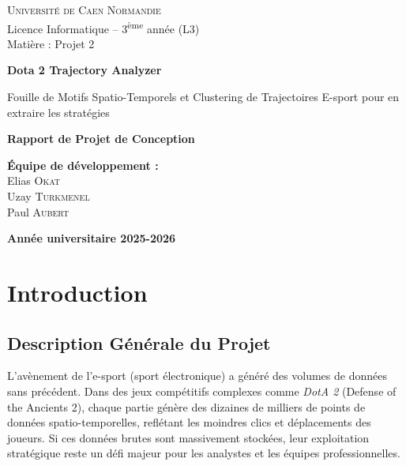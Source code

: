 \documentclass[11pt, a4paper]{article}
\begin{document}
\begin{titlepage}
    \centering
    \vspace*{1cm}
    
    \Large \textsc{Université de Caen Normandie} \\
    \large Licence Informatique -- 3\textsuperscript{ème} année (L3) \\
    \large Matière : Projet 2
    
    \vspace{3cm}
    
    \Huge
    \textbf{Dota 2 Trajectory Analyzer}
    
    \vspace{0.5cm}
    \LARGE
    Fouille de Motifs Spatio-Temporels et Clustering de Trajectoires E-sport pour en extraire les stratégies
    
    \vspace{1.5cm}
    
    \textbf{Rapport de Projet de Conception}
    
    \vspace{2.5cm}
    
    \Large
    \textbf{Équipe de développement :} \\
    \vspace{0.5cm}
    Elias \textsc{Okat} \\
    Uzay \textsc{Turkmenel} \\
    Paul \textsc{Aubert}
    
    \vfill
    
    \Large
    \textbf{Année universitaire 2025-2026}
    
    \vspace{1cm}
\end{titlepage}

\tableofcontents
\newpage

\section{Introduction}

\subsection{Description Générale du Projet}

L'avènement de l'e-sport (sport électronique) a généré des volumes de données sans précédent. Dans des jeux compétitifs complexes comme \textit{DotA 2} (Defense of the Ancients 2), chaque partie génère des dizaines de milliers de points de données spatio-temporelles, reflétant les moindres clics et déplacements des joueurs. Si ces données brutes sont massivement stockées, leur exploitation stratégique reste un défi majeur pour les analystes et les équipes professionnelles.
\end{document}
